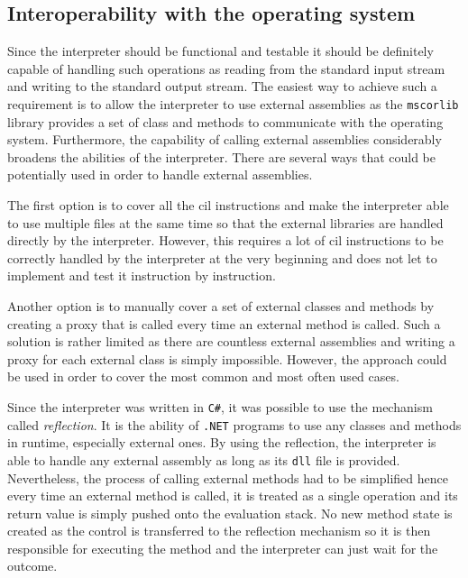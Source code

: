\documentclass[declaration,shortabstract,english,mgr]{iithesis}
\begin{document}
\subsection{Interoperability with the operating system}

Since the interpreter should be functional and testable it should be definitely capable of handling such operations as reading from the standard input stream and writing to the standard output stream. The easiest way to achieve such a requirement is to allow the interpreter to use external assemblies as the \texttt{mscorlib} library provides a set of class and methods to communicate with the operating system. Furthermore, the capability of calling external assemblies considerably broadens the abilities of the interpreter. There are several ways that could be potentially used in order to handle external assemblies.

The first option is to cover all the \acrshort{cil} instructions and make the interpreter able to use multiple files at the same time so that the external libraries are handled directly by the interpreter. However, this requires a lot of \acrshort{cil} instructions to be correctly handled by the interpreter at the very beginning and does not let to implement and test it instruction by instruction.

Another option is to manually cover a set of external classes and methods by creating a proxy that is called every time an external method is called. Such a solution is rather limited as there are countless external assemblies and writing a proxy for each external class is simply impossible. However, the approach could be used in order to cover the most common and most often used cases.

Since the interpreter was written in \texttt{C\#}, it was possible to use the mechanism called \textit{reflection}. It is the ability of \texttt{.NET} programs to use any classes and methods in runtime, especially external ones. By using the reflection, the interpreter is able to handle any external assembly as long as its \texttt{dll} file is provided. Nevertheless, the process of calling external methods had to be simplified hence every time an external method is called, it is treated as a single operation and its return value is simply pushed onto the evaluation stack. No new method state is created as the control is transferred to the reflection mechanism so it is then responsible for executing the method and the interpreter can just wait for the outcome.
\end{document}
